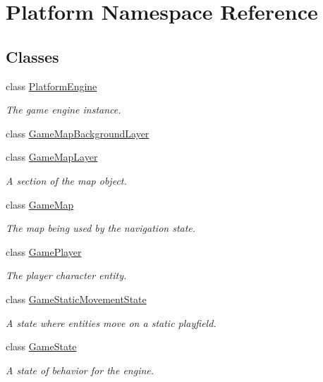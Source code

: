 \hypertarget{namespace_platform}{
\section{Platform Namespace Reference}
\label{dc/d0e/namespace_platform}
}
\subsection*{Classes}
\begin{CompactItemize}
\item 
class \hyperlink{class_platform_1_1_platform_engine}{PlatformEngine}
\begin{CompactList}\small\item\em The game engine instance. \item\end{CompactList}\item 
class \hyperlink{class_platform_1_1_game_map_background_layer}{GameMapBackgroundLayer}
\item 
class \hyperlink{class_platform_1_1_game_map_layer}{GameMapLayer}
\begin{CompactList}\small\item\em A section of the map object. \item\end{CompactList}\item 
class \hyperlink{class_platform_1_1_game_map}{GameMap}
\begin{CompactList}\small\item\em The map being used by the navigation state. \item\end{CompactList}\item 
class \hyperlink{class_platform_1_1_game_player}{GamePlayer}
\begin{CompactList}\small\item\em The player character entity. \item\end{CompactList}\item 
class \hyperlink{class_platform_1_1_game_static_movement_state}{GameStaticMovementState}
\begin{CompactList}\small\item\em A state where entities move on a static playfield. \item\end{CompactList}\item 
class \hyperlink{class_platform_1_1_game_state}{GameState}
\begin{CompactList}\small\item\em A state of behavior for the engine. \item\end{CompactList}\end{CompactItemize}
